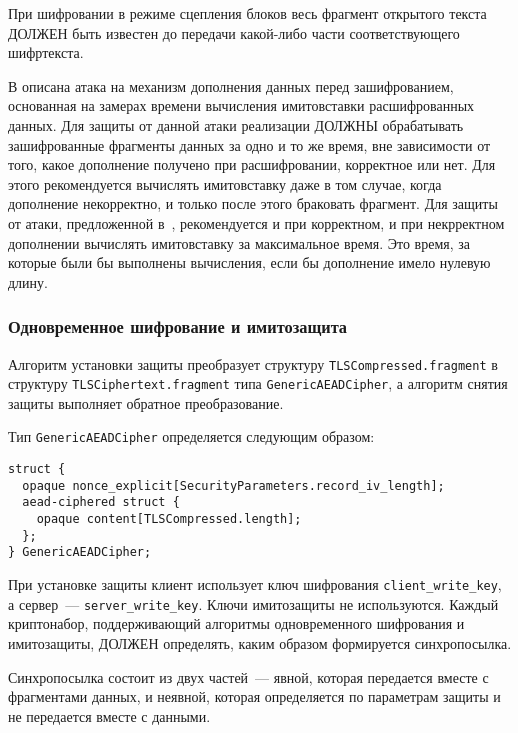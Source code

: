 \begin{note}
При шифровании в режиме сцепления блоков весь фрагмент 
открытого текста ДОЛЖЕН быть известен до передачи какой-либо части 
соответствующего шифртекста.
\end{note}

\begin{note}
В \cite{PwdInterception} описана атака на механизм 
дополнения данных перед зашифрованием, основанная на замерах времени 
вычисления имитовставки расшифрованных данных. Для защиты от данной атаки 
реализации ДОЛЖНЫ обрабатывать зашифрованные фрагменты данных за одно и то 
же время, вне зависимости от того, какое дополнение получено при 
расшифровании, корректное или нет. Для этого рекомендуется вычислять 
имитовставку даже в том случае, когда дополнение некорректно, и только 
после этого браковать фрагмент. Для защиты от атаки, предложенной в~\cite{Lucky13}, 
рекомендуется и при корректном, и при некрректном дополнении вычислять 
имитовставку за максимальное время. Это время, за которые были бы 
выполнены вычисления, если бы дополнение имело нулевую длину. 
\end{note}

\subsubsection{Одновременное шифрование и имитозащита}\label{RECORD.3.3.3}

Алгоритм установки защиты преобразует структуру 
\lstinline{TLSCompressed.fragment} в структуру 
\lstinline{TLSCiphertext.fragment} типа \lstinline{GenericAEADCipher}, а 
алгоритм снятия защиты выполняет обратное преобразование. 

Тип \lstinline{GenericAEADCipher} определяется следующим образом:
\begin{lstlisting}
struct {
  opaque nonce_explicit[SecurityParameters.record_iv_length];
  aead-ciphered struct {
    opaque content[TLSCompressed.length];
  };
} GenericAEADCipher;
\end{lstlisting}

При установке защиты клиент использует ключ шифрования \lstinline{client_write_key}, 
а сервер~--- \lstinline{server_write_key}. Ключи имитозащиты не используются. 
Каждый криптонабор, поддерживающий алгоритмы одновременного шифрования и 
имитозащиты, ДОЛЖЕН определять, каким образом формируется синхропосылка. 

Синхропосылка состоит из двух частей~--- явной, которая передается вместе с 
фрагментами данных, и неявной, которая определяется по параметрам защиты 
и не передается вместе с данными.   

